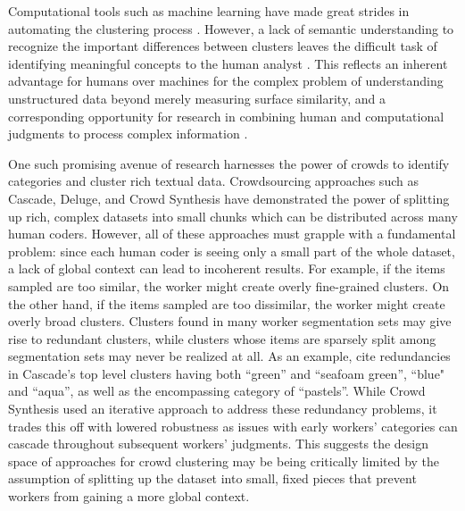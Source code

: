 Computational tools such as machine learning have made great strides in automating the clustering process \cite{blei2003latent,chuang2012termite,chaney2012visualizing}. However, a lack of semantic understanding to recognize the important differences between clusters leaves the difficult task of identifying meaningful concepts to the human analyst \cite{chuang2012interpretation}. This reflects an inherent advantage for humans over machines for the complex problem of understanding unstructured data beyond merely measuring surface similarity, and a corresponding opportunity for research in combining human and computational judgments to process complex information \cite{fails2003interactive, Kulesza:2014:SLF:2611247.2557238, hu2014interactive}.

One such promising avenue of research harnesses the power of crowds to identify categories and cluster rich textual data. Crowdsourcing approaches such as Cascade, Deluge, and Crowd Synthesis \cite{chilton2013cascade,bragg2013crowdsourcing,andre2014crowd} have demonstrated the power of splitting up rich, complex datasets into small chunks which can be distributed across many human coders. However, all of these approaches must grapple with a fundamental problem: since each human coder is seeing only a small part of the whole dataset, a lack of global context can lead to incoherent results.  For example, if the items sampled are too similar, the worker might create overly fine-grained clusters. On the other hand, if the items sampled are too dissimilar, the worker might create overly broad clusters. Clusters found in many worker segmentation sets may give rise to redundant clusters, while clusters whose items are sparsely split among segmentation sets may never be realized at all. As an example, \cite{andre2014crowd} cite redundancies in Cascade's top level clusters having both ``green'' and ``seafoam green'', ``blue" and ``aqua'', as well as the encompassing category of ``pastels''. While Crowd Synthesis used an iterative approach to address these redundancy problems, it trades this off with lowered robustness as issues with early workers' categories can cascade throughout subsequent workers' judgments. This suggests the design space of approaches for crowd clustering may be being critically limited by the assumption of splitting up the dataset into small, fixed pieces that prevent workers from gaining a more global context.

